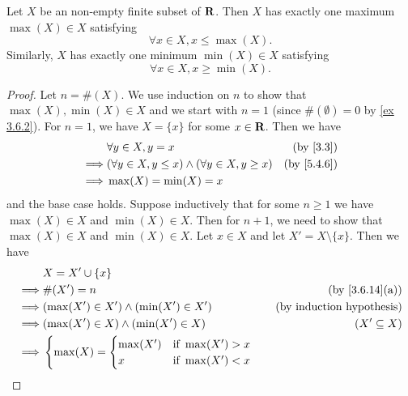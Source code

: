 \begin{additional corollary}\label{ac 5.4.1}
Let \(X\) be an non-empty finite subset of \(\mathbf{R}\).
Then \(X\) has exactly one maximum \(\max(X) \in X\) satisfying
\[
  \forall x \in X, x \leq \max(X).
\]
Similarly, \(X\) has exactly one minimum \(\min(X) \in X\) satisfying
\[
  \forall x \in X, x \geq \min(X).
\]
\end{additional corollary}

\begin{proof}
  Let \(n = \#(X)\).
  We use induction on \(n\) to show that \(\max(X), \min(X) \in X\) and we start with \(n = 1\) (since \(\#(\emptyset) = 0\) by \cref{ex 3.6.2}).
  For \(n = 1\), we have \(X = \{x\}\) for some \(x \in \mathbf{R}\).
  Then we have
  \begin{align*}
             & \forall y \in X, y = x                                        & \text{(by \cref{3.3})}   \\
    \implies & (\forall y \in X, y \leq x) \land (\forall y \in X, y \geq x) & \text{(by \cref{5.4.6})} \\
    \implies & \max(X) = \min(X) = x
  \end{align*}
  and the base case holds.
  Suppose inductively that for some \(n \geq 1\) we have \(\max(X) \in X\) and \(\min(X) \in X\).
  Then for \(n + 1\), we need to show that \(\max(X) \in X\) and \(\min(X) \in X\).
  Let \(x \in X\) and let \(X' = X \setminus \{x\}\).
  Then we have
  \begin{align*}
             & X = X' \cup \{x\}                                                                                                            \\
    \implies & \#(X') = n                                                                                & \text{(by \cref{3.6.14}(a))}     \\
    \implies & (\max(X') \in X') \land (\min(X') \in X')                                                 & \text{(by induction hypothesis)} \\
    \implies & (\max(X') \in X) \land (\min(X') \in X)                                                   & (X' \subseteq X)                 \\
    \implies & \begin{cases}
                 \max(X) = \begin{cases}
                  \max(X') & \text{if } \max(X') > x \\
                  x        & \text{if } \max(X') < x
                \end{cases} \\

\end{cases}
\end{align*}
\end{proof}

